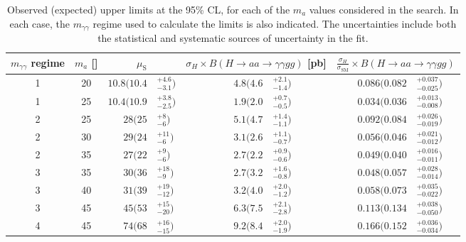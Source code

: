 \begin{table}[t]
  \begin{center}
    \caption{Observed (expected) upper limits at the 95\% CL, for each of the $m_a$ values considered in the search.
      In each case, the $m_{\gamma\gamma}$ regime used to calculate the limits is also indicated.
      The uncertainties include both the statistical and systematic sources of uncertainty in the fit.}
    \label{tab:HBSM:limits}
          {\footnotesize
            \bgroup
            \def\arraystretch{1.5}
            \begin{tabular}{ccr@{}lr@{}lr@{}l}
	    \hline
            $m_{\gamma\gamma}$ regime & $m_a$ [\GeV{}] & \multicolumn{2}{c}{$\mu_\text{S}$}   & \multicolumn{2}{c}{$\sigma_H\times B(H\to aa \to \gamma\gamma gg)$ [pb]}  & \multicolumn{2}{c}{$\frac{\sigma_H}{\sigma_\text{SM}}\times B(H\to aa \to \gamma\gamma gg)$} \\
	    \hline
            1 & 20 & $10.8\Big(10.4$&$^{+4.6}_{-3.1}\Big)$   & \hspace{1.1cm}$4.8\Big(4.6$&$^{+2.1}_{-1.4}\Big)$  & \hspace{0.505cm}$0.086\Big(0.082$&$^{+0.037}_{-0.025}\Big)$ \\
            1 & 25 & $10.4\Big(10.9$&$^{+3.8}_{-2.5}\Big)$   & $1.9\Big(2.0$&$^{+0.7}_{-0.5}\Big)$  & $0.034\Big(0.036$&$^{+0.013}_{-0.008}\Big)$ \\
            2 & 25 & $28\Big(25$&$^{+8}_{-6}\Big)$   & $5.1\Big(4.7$&$^{+1.4}_{-1.1}\Big)$  & $0.092\Big(0.084$&$^{+0.026}_{-0.019}\Big)$ \\
            2 & 30 & $29\Big(24$&$^{+11}_{-6}\Big)$  & $3.1\Big(2.6$&$^{+1.1}_{-0.7}\Big)$ & $0.056\Big(0.046$&$^{+0.021}_{-0.012}\Big)$ \\
            2 & 35 & $27\Big(22$&$^{+9}_{-6}\Big)$   & $2.7\Big(2.2$&$^{+0.9}_{-0.6}\Big)$ & $0.049\Big(0.040$&$^{+0.016}_{-0.011}\Big)$  \\
            3 & 35 & $30\Big(36$&$^{+18}_{-9}\Big)$  & $2.7\Big(3.2$&$^{+1.6}_{-0.8}\Big)$ & $0.048\Big(0.057$&$^{+0.028}_{-0.014}\Big)$  \\
            3 & 40 & $31\Big(39$&$^{+19}_{-12}\Big)$ & $3.2\Big(4.0$&$^{+2.0}_{-1.2}\Big)$  & $0.058\Big(0.073$&$^{+0.035}_{-0.022}\Big)$ \\
            3 & 45 & $45\Big(53$&$^{+15}_{-20}\Big)$ & $6.3\Big(7.5$&$^{+2.1}_{-2.8}\Big)$   & $0.113\Big(0.134$&$^{+0.038}_{-0.050}\Big)$     \\
            4 & 45 & $74\Big(68$&$^{+16}_{-15}\Big)$ & $9.2\Big(8.4$&$^{+2.0}_{-1.9}\Big)$  & $0.166\Big(0.152$&$^{+0.036}_{-0.034}\Big)$ \\

\end{tabular}}
\end{center}
\end{table}
